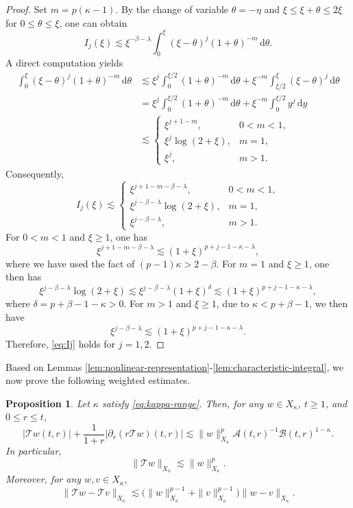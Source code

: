 \documentclass[11pt,twoside]{article}
\newcommand{\p}{\partial}
\newcommand{\f}{\frac}
\newcommand{\Acal}{\mathcal A}
\newcommand{\Bcal}{\mathcal B}
\newcommand{\dd}{\,\mathrm{d}}
\newcommand{\Tcal}{\mathcal T}
\theoremstyle{plain}
\newtheorem{proposition}{Proposition}[section]
\theoremstyle{definition}
\theoremstyle{remark}
\numberwithin{equation}{section}
\begin{document}
\begin{proof}
Set $m=p(\kappa-1)$. By the change of variable $\theta=-\eta$ and
$\xi\leq\xi+\theta\leq2\xi$ for $0\leq\theta\leq\xi$, one can obtain
\[
I_j(\xi)
\lesssim
\xi^{-\beta-\lambda}
\int_0^\xi
(\xi-\theta)^j(1+\theta)^{-m}\dd\theta.
\]
A direct computation yields
\[
\begin{aligned}
\int_0^\xi
(\xi-\theta)^j(1+\theta)^{-m}\dd\theta
&\lesssim
\xi^j
\int_0^{\xi/2}
(1+\theta)^{-m}\dd\theta
+
\xi^{-m}
\int_{\xi/2}^{\xi}
(\xi-\theta)^j\dd\theta\\
&=
\xi^j
\int_0^{\xi/2}
(1+\theta)^{-m}\dd\theta
+
\xi^{-m}
\int_0^{\xi/2}
y^j\dd y\\
&\lesssim
\begin{cases}
\xi^{j+1-m},&0<m<1,\\
\xi^j\log(2+\xi),&m=1,\\
\xi^j,&m>1.
\end{cases}
\end{aligned}
\]
Consequently,
\[
I_j(\xi)
\lesssim
\begin{cases}
\xi^{j+1-m-\beta-\lambda},&0<m<1,\\
\xi^{j-\beta-\lambda}\log(2+\xi),&m=1,\\
\xi^{j-\beta-\lambda},&m>1.
\end{cases}
\]
For $0<m<1$ and $\xi\geq1$, one has
\[
\xi^{j+1-m-\beta-\lambda}
\lesssim
(1+\xi)^{p+j-1-\kappa-\lambda},
\]
where we have used the fact of $(p-1)\kappa>2-\beta$. For $m=1$ and
$\xi\geq1$, one then has
\begin{equation}\label{DELTA}
\xi^{j-\beta-\lambda}\log(2+\xi)
\lesssim
\xi^{j-\beta-\lambda}(1+\xi)^\delta
\lesssim
(1+\xi)^{p+j-1-\kappa-\lambda},
\end{equation}
where $\delta=p+\beta-1-\kappa>0$. For $m>1$ and $\xi\geq1$, due to
$\kappa<p+\beta-1$, we then have
\[
\xi^{j-\beta-\lambda}
\lesssim
(1+\xi)^{p+j-1-\kappa-\lambda}.
\]
Therefore, \eqref{eq:Ij} holds for $j=1,2$.
\end{proof}

Based on Lemmas \ref{lem:nonlinear-representation}-\ref{lem:characteristic-integral}, we now prove the following weighted estimates.

\begin{proposition}
\label{prop:nonlinear}
Let $\kappa$ satisfy \eqref{eq:kappa-range}. Then, for any
$w\in X_\kappa$, $t\geq1$, and $0\leq r\leq t$,
\begin{equation}
\label{qq:47}
|\Tcal w(t,r)|
+
\f{1}{1+r}
\left|
\p_r(r\Tcal w)(t,r)
\right|
\lesssim
\|w\|_{X_\kappa}^{p}
\Acal(t,r)^{-1}\Bcal(t,r)^{1-\kappa}.
\end{equation}
In particular,
\begin{equation}
\label{qq:48}
\|\Tcal w\|_{X_\kappa}
\lesssim
\|w\|_{X_\kappa}^{p}.
\end{equation}
Moreover, for any $w,v\in X_\kappa$,
\begin{equation}
\label{qq:49}
\|\Tcal w-\Tcal v\|_{X_\kappa}
\lesssim
\big(
\|w\|_{X_\kappa}^{p-1}
+
\|v\|_{X_\kappa}^{p-1}
\big)
\|w-v\|_{X_\kappa}.
\end{equation}
\end{proposition}
\end{document}
